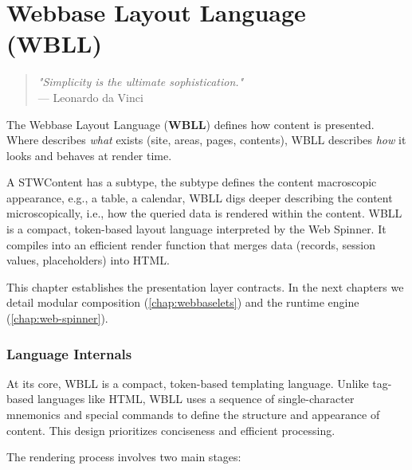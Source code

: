 
\chapter{Webbase Layout Language (WBLL)}
\label{chap:wbll}

\begin{quote}
\textit{"Simplicity is the ultimate sophistication."} \\
— Leonardo da Vinci
\end{quote}

The Webbase Layout Language (\textbf{WBLL}) defines how content is presented. Where \wbdl{} describes \textit{what} exists (site, areas, pages, contents), WBLL describes \textit{how} it looks and behaves at render time.

A STWContent has a subtype, the subtype defines the content macroscopic appearance, e.g., a table, a calendar, WBLL digs deeper describing the content microscopically, i.e., how the queried data is rendered within the content. WBLL is a compact, token-based layout language interpreted by the Web Spinner. It compiles into an efficient render function that merges data (records, session values, placeholders) into HTML.



This chapter establishes the presentation layer contracts. In the next chapters we detail modular composition (\cref{chap:webbaselets}) and the runtime engine (\cref{chap:web-spinner}).

\subsection{Language Internals}

At its core, WBLL is a compact, token-based templating language. Unlike tag-based languages like HTML, WBLL uses a sequence of single-character mnemonics and special commands to define the structure and appearance of content. This design prioritizes conciseness and efficient processing.

The rendering process involves two main stages:

